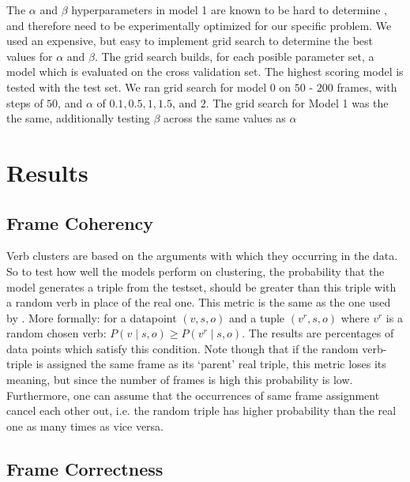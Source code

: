 \documentclass{article} %
\begin{document}
The $\alpha$ and $\beta$ hyperparameters in model 1 are known  to be hard to determine \citep{oconnor2013}, and therefore need to be experimentally optimized for our specific problem. We used an expensive, but easy to implement grid search to determine the best values for $\alpha$ and $\beta$. The grid search builds, for each posible parameter set, a model which is evaluated on the cross validation set. The highest scoring model is tested with the test set. We ran grid search for model 0 on $50$ - $200$ frames, with steps of $50$, and $\alpha$ of $0.1, 0.5, 1, 1.5$, and $2$. The grid search for Model 1 was the the same, additionally testing $\beta$ across the same values as $\alpha$
\section{Results}
\label{results}

\subsection{Frame Coherency}
Verb clusters are based on the arguments with which they occurring in the data. So to test how well the models perform on clustering, the probability that the model generates a triple from the testset, should be greater than this triple with a random verb in place of the real one. This metric is the same as the one used by \citeauthor{rooth1999}. More formally: for a datapoint $(v,s,o)$ and a tuple $(v^r,s,o)$ where $v^r$ is a random chosen verb: $P(v\mid s,o) \geq P(v^r\mid s,o)$.
The results are percentages of data points which satisfy this condition. Note though that if the random verb-triple is assigned the same frame as its `parent' real triple, this metric loses its meaning, but since the number of frames is high this probability is low. Furthermore, one can assume that the occurrences of same frame assignment cancel each other out, i.e. the random triple has higher probability than the real one as many times as vice versa.

\subsection{Frame Correctness}
\end{document}
